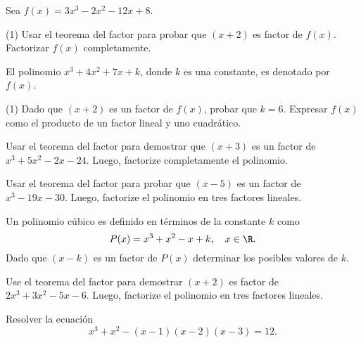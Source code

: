\begin{multicols}{2}

    \begin{exercise}
        Sea $f(x) = 3x^3 - 2x^2 - 12x + 8$.
        \begin{tasks}[label=\alph*.](1)
            \task Usar el teorema del factor para probar que $(x + 2)$ es factor de $f(x)$.
            \task Factorizar $f(x)$ completamente.
        \end{tasks}
    \end{exercise}

    \begin{exercise}
        El polinomio $x^3 + 4x^2 + 7x + k$, donde $k$ es una constante, es denotado por $f(x)$.
        \begin{tasks}[label=\alph*.](1)
            \task Dado que $(x + 2)$ es un factor de $f(x)$, probar que $k = 6$.
            \task Expresar $f(x)$ como el producto de un factor lineal y uno cuadrático.
        \end{tasks}
    \end{exercise}

    \begin{exercise}
        Usar el teorema del factor para demostrar que $(x + 3)$ es un factor de $x^3 + 5x^2 - 2x - 24$.
        Luego, factorize completamente el polinomio.
    \end{exercise}

    \begin{exercise}
        Usar el teorema del factor para probar que $(x - 5)$ es un factor de $x^3 - 19x - 30$.
        Luego, factorize el polinomio en tres factores lineales.
    \end{exercise}

    \begin{exercise}
        Un polinomio cúbico es definido en términos de la constante $k$ como
        \[
            P(x) = x^3 + x^2 - x + k,\quad x \in \R.
        \]
        Dado que $(x - k)$ es un factor de $P(x)$ determinar los posibles valores de $k$.
    \end{exercise}

    \begin{exercise}
        Use el teorema del factor para demostrar $(x + 2)$ es factor de $2x^3 + 3x^2 - 5x - 6$.
        Luego, factorize el polinomio en tres factores lineales.
    \end{exercise}

    \begin{exercise}
        Resolver la ecuación
        \[
            x^3 + x^2 - (x - 1)(x - 2)(x - 3) = 12.
        \]
    \end{exercise}


\end{multicols}
